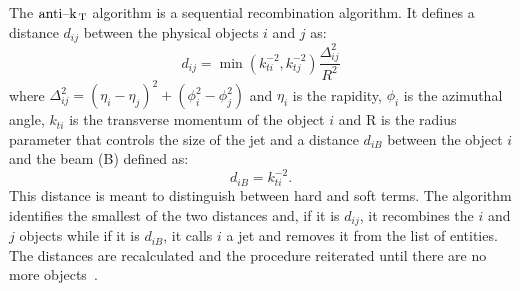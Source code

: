 The $\text{anti--k}_\mathrm{\, T}$ algorithm is a sequential recombination algorithm. It defines a
distance $d_{ij}$ between the physical objects $i$ and $j$ as:
\begin{equation}
  \label{eq:80}
  d_{ij} = \min(k_{ti}^{-2}, k_{tj}^{-2}) \frac{\Delta_{ij}^2}{R^2}
\end{equation}
where $\Delta_{ij}^2 = (\eta_i - \eta_j)^2 + (\phi_i^2 - \phi_j^2)$ and $\eta_i$
is the rapidity, $\phi_i$ is the azimuthal angle, $k_{ti}$ is the transverse
momentum of the object $i$ and R is the radius parameter that controls the size
of the jet and a distance $d_{iB}$ between the object $i$ and the beam (B)
defined as:
\begin{equation}
  \label{eq:81}
  d_{iB} = k_{ti}^{-2}.
\end{equation}
This distance is meant to distinguish between hard and soft terms. The algorithm
identifies the smallest of the two distances and, if it is $d_{ij}$, it
recombines the $i$ and $j$ objects while if it is $d_{iB}$, it calls $i$ a jet
and removes it from the list of entities. The distances are recalculated and the
procedure reiterated until there are no more objects~\cite{Antikt}.
